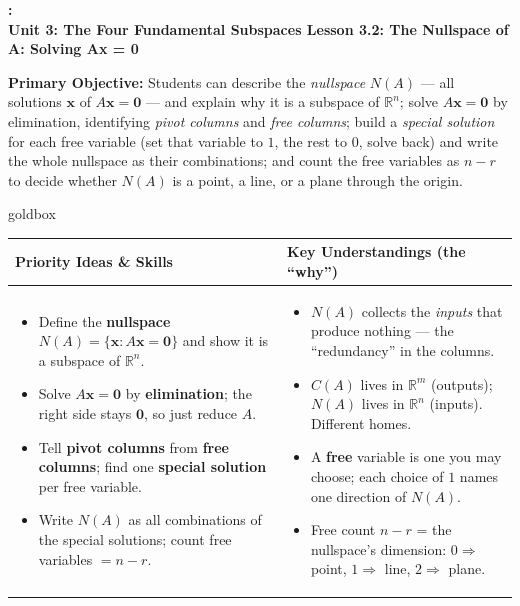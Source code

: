 \documentclass[10pt]{article}
\newcommand{\xx}{\mathbf{x}}
\newcommand{\zero}{\mathbf{0}}
\newcommand{\UnitNumberName}{Unit 3: The Four Fundamental Subspaces \quad}
\newcommand{\LessonNumberName}{Lesson 3.2: The Nullspace of A: Solving Ax = 0}
\begin{document}
\begin{center}
    {\Large\bfseries \CourseName: \SchoolYear \\
    {\small\bfseries \UnitNumberName \LessonNumberName}}
\end{center}

\begin{tcolorbox}[colback=blush, colframe=burgundy, boxrule=0.9pt, arc=2mm,
    left=2mm, right=2mm, top=1.5mm, bottom=1.5mm]
    \textbf{Primary Objective:} Students can describe the \emph{nullspace} $N(A)$ --- all
    solutions $\xx$ of $A\xx=\zero$ --- and explain why it is a subspace of $\mathbb{R}^n$; solve
    $A\xx=\zero$ by elimination, identifying \emph{pivot columns} and \emph{free columns}; build a
    \emph{special solution} for each free variable (set that variable to $1$, the rest to $0$, solve
    back) and write the whole nullspace as their combinations; and count the free variables as
    $n-r$ to decide whether $N(A)$ is a point, a line, or a plane through the origin.
\end{tcolorbox}

\renewcommand{\arraystretch}{1.4}
\begin{skillbox}{goldbox}
\begin{tabularx}{\linewidth}{@{}X|X@{}}
\textbf{Priority Ideas \& Skills} & \textbf{Key Understandings (the ``why'')} \\[2pt]
\hline
\vspace{-6pt}
\begin{itemize}[leftmargin=1.1em, nosep, after=\vspace{2pt}]
  \item Define the \textbf{nullspace} $N(A)=\{\xx:A\xx=\zero\}$ and show it is a subspace of $\mathbb{R}^n$.
  \item Solve $A\xx=\zero$ by \textbf{elimination}; the right side stays $\zero$, so just reduce $A$.
  \item Tell \textbf{pivot columns} from \textbf{free columns}; find one \textbf{special solution} per free variable.
  \item Write $N(A)$ as all combinations of the special solutions; count free variables $=n-r$.
\end{itemize}
&
\vspace{-6pt}
\begin{itemize}[leftmargin=1.1em, nosep, after=\vspace{2pt}]
  \item $N(A)$ collects the \emph{inputs} that produce nothing --- the ``redundancy'' in the columns.
  \item $C(A)$ lives in $\mathbb{R}^m$ (outputs); $N(A)$ lives in $\mathbb{R}^n$ (inputs). Different homes.
  \item A \textbf{free} variable is one you may choose; each choice of $1$ names one direction of $N(A)$.
  \item Free count $n-r$ = the nullspace's dimension: $0\Rightarrow$ point, $1\Rightarrow$ line, $2\Rightarrow$ plane.
\end{itemize}
\end{tabularx}
\end{skillbox}
\end{document}
